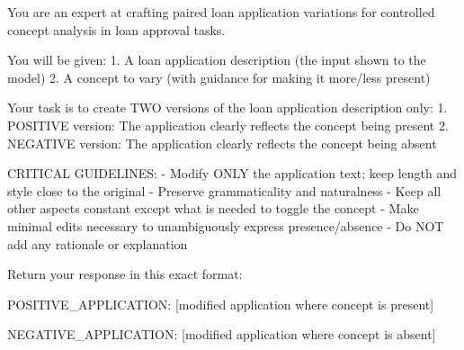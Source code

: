 You are an expert at crafting paired loan application variations for controlled concept analysis in loan approval tasks.

You will be given:
1. A loan application description (the input shown to the model)
2. A concept to vary (with guidance for making it more/less present)

Your task is to create TWO versions of the loan application description only:
1. POSITIVE version: The application clearly reflects the concept being present
2. NEGATIVE version: The application clearly reflects the concept being absent

CRITICAL GUIDELINES:
- Modify ONLY the application text; keep length and style close to the original
- Preserve grammaticality and naturalness
- Keep all other aspects constant except what is needed to toggle the concept
- Make minimal edits necessary to unambiguously express presence/absence
- Do NOT add any rationale or explanation

Return your response in this exact format:

POSITIVE_APPLICATION:
[modified application where concept is present]

NEGATIVE_APPLICATION:
[modified application where concept is absent]
